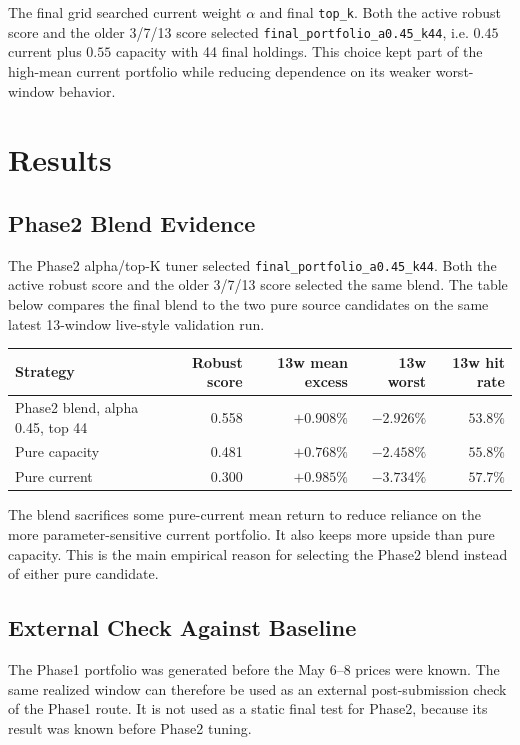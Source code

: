 \documentclass[11pt]{article}
\begin{document}
The final grid searched current weight \(\alpha\) and final \texttt{top\_k}.
Both the active robust score and the older 3/7/13 score selected
\texttt{final\_portfolio\_a0.45\_k44}, i.e. \(0.45\) current plus \(0.55\)
capacity with 44 final holdings. This choice kept part of the high-mean current
portfolio while reducing dependence on its weaker worst-window behavior.

\clearpage

\section{Results}

\subsection{Phase2 Blend Evidence}

The Phase2 alpha/top-K tuner selected \texttt{final\_portfolio\_a0.45\_k44}.
Both the active robust score and the older 3/7/13 score selected the same blend.
The table below compares the final blend to the two pure source candidates on
the same latest 13-window live-style validation run.

\begin{table}[h]
\centering
\begin{tabular}{lrrrr}
\toprule
Strategy & Robust score & 13w mean excess & 13w worst & 13w hit rate \\
\midrule
Phase2 blend, alpha 0.45, top 44 & 0.558 & \(+0.908\%\) & \(-2.926\%\) & \(53.8\%\) \\
Pure capacity & 0.481 & \(+0.768\%\) & \(-2.458\%\) & \(55.8\%\) \\
Pure current & 0.300 & \(+0.985\%\) & \(-3.734\%\) & \(57.7\%\) \\
\bottomrule
\end{tabular}
\end{table}

The blend sacrifices some pure-current mean return to reduce reliance on the
more parameter-sensitive current portfolio. It also keeps more upside than pure
capacity. This is the main empirical reason for selecting the Phase2 blend
instead of either pure candidate.

\subsection{External Check Against Baseline}

The Phase1 portfolio was generated before the May 6--8 prices were known. The
same realized window can therefore be used as an external post-submission check
of the Phase1 route. It is not used as a static final test for Phase2, because
its result was known before Phase2 tuning.
\end{document}
